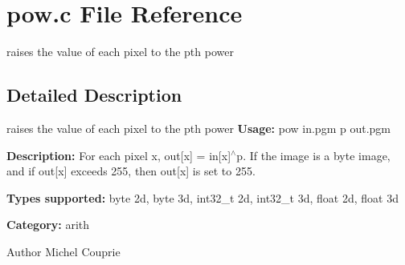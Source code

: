 \section{pow.c File Reference}
\label{pow_8c}


raises the value of each pixel to the pth power  




\subsection{Detailed Description}
raises the value of each pixel to the pth power {\bfseries Usage:} pow in.pgm p out.pgm

{\bfseries Description:} For each pixel x, out[x] = in[x]$^\wedge$p. If the image is a byte image, and if out[x] exceeds 255, then out[x] is set to 255.

{\bfseries Types supported:} byte 2d, byte 3d, int32\_\-t 2d, int32\_\-t 3d, float 2d, float 3d

{\bfseries Category:} arith

\begin{DoxyAuthor}{Author}
Michel Couprie 
\end{DoxyAuthor}
